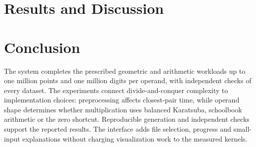\documentclass[10pt,a4paper,twocolumn]{article}
\begin{document}
\section{Results and Discussion}


\section{Conclusion}
The system completes the prescribed geometric and arithmetic workloads up to one million points and one million digits per operand, with independent checks of every dataset. The experiments connect divide-and-conquer complexity to implementation choices: preprocessing affects closest-pair time, while operand shape determines whether multiplication uses balanced Karatsuba, schoolbook arithmetic or the zero shortcut. Reproducible generation and independent checks support the reported results. The interface adds file selection, progress and small-input explanations without charging visualization work to the measured kernels.

\begingroup
\small
\setlength{\parskip}{0pt}


\endgroup
\end{document}

